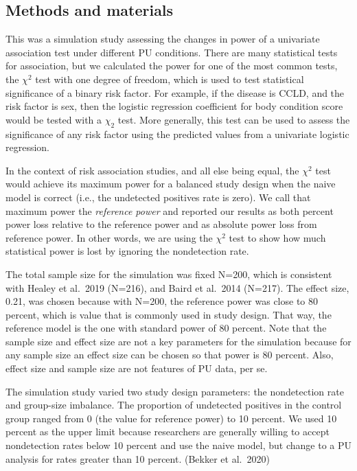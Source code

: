 \documentclass[
]{article}
\begin{document}
\hypertarget{methods-and-materials}{%
\subsection{Methods and materials}\label{methods-and-materials}}

This was a simulation study assessing the changes in power of a
univariate association test under different PU conditions. There are
many statistical tests for association, but we calculated the power for
one of the most common tests, the \(\chi^2\) test with one degree of
freedom, which is used to test statistical significance of a binary risk
factor. For example, if the disease is CCLD, and the risk factor is sex,
then the logistic regression coefficient for body condition score would
be tested with a \(\chi_2\) test. More generally, this test can be used
to assess the significance of any risk factor using the predicted values
from a univariate logistic regression.

In the context of risk association studies, and all else being equal,
the \(\chi^2\) test would achieve its maximum power for a balanced study
design when the naive model is correct (i.e., the undetected positives
rate is zero). We call that maximum power the \emph{reference power} and
reported our results as both percent power loss relative to the
reference power and as absolute power loss from reference power. In
other words, we are using the \(\chi^2\) test to show how much
statistical power is lost by ignoring the nondetection rate.

The total sample size for the simulation was fixed N=200, which is
consistent with Healey et al.~2019 (N=216), and Baird et al.~2014
(N=217). The effect size, 0.21, was chosen because with N=200, the
reference power was close to 80 percent, which is value that is commonly
used in study design. That way, the reference model is the one with
standard power of 80 percent. Note that the sample size and effect size
are not a key parameters for the simulation because for any sample size
an effect size can be chosen so that power is 80 percent. Also, effect
size and sample size are not features of PU data, per se.

The simulation study varied two study design parameters: the
nondetection rate and group-size imbalance. The proportion of undetected
positives in the control group ranged from 0 (the value for reference
power) to 10 percent. We used 10 percent as the upper limit because
researchers are generally willing to accept nondetection rates below 10
percent and use the naive model, but change to a PU analysis for rates
greater than 10 percent. (Bekker et al.~2020)
\end{document}
